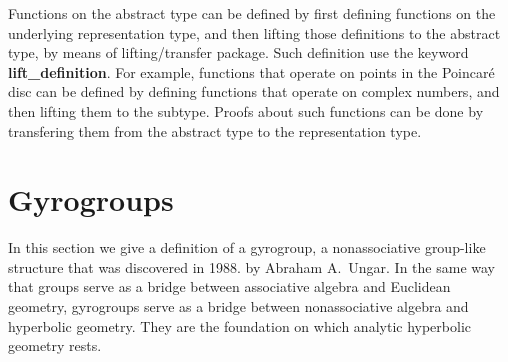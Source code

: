 \documentclass[a4paper]{article}
\theoremstyle{definition}
\begin{document}
Functions on the abstract type can be defined by first defining
functions on the underlying representation type, and then lifting
those definitions to the abstract type, by means of lifting/transfer
package\cite{isabelle-lifting-transfer}. Such definition use the
keyword \textbf{lift\_definition}. For example, functions that operate
on points in the Poincar\'e disc can be defined by defining functions
that operate on complex numbers, and then lifting them to the subtype.
Proofs about such functions can be done by transfering them from the
abstract type to the representation type.

\section{Gyrogroups}\label{sec:gyrogroups}

In this section we give a definition of a gyrogroup, a nonassociative
group-like structure that was discovered in 1988. by Abraham
A.~Ungar\cite{}. In the same way that groups serve as a bridge between
associative algebra and Euclidean geometry, gyrogroups serve as a
bridge between nonassociative algebra and hyperbolic geometry. They
are the foundation on which analytic hyperbolic geometry rests.
\end{document}
